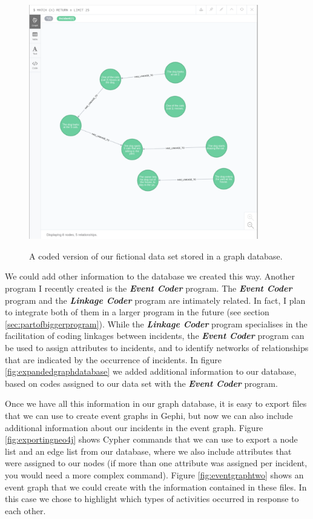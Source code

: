 \documentclass{memoir}
\begin{document}
\begin{figure}[h!]
  \centering
  \caption{A coded version of our fictional data set stored in a graph database.}
  \includegraphics[width=100mm]{Screenshot_17.pdf}
  \label{fig:graphdatabaseexample}
\end{figure}

We could add other information to the database we created this way. Another program I recently created is the \textbf{\emph{Event Coder}} program. The \textbf{\emph{Event Coder}} program and the \textbf{\emph{Linkage Coder}} program are intimately related. In fact, I plan to integrate both of them in a larger program in the future (see section \ref{sec:partofbiggerprogram}). While the \textbf{\emph{Linkage Coder}} program specialises in the facilitation of coding linkages between incidents, the \emph{\textbf{Event Coder}} program can be used to assign attributes to incidents, and to identify networks of relationships that are indicated by the occurrence of incidents. In figure \ref{fig:expandedgraphdatabase} we added additional information to our database, based on codes assigned to our data set with the \textbf{\emph{Event Coder}} program.

Once we have all this information in our graph database, it is easy to export files that we can use to create event graphs in Gephi, but now we can also include additional information about our incidents in the event graph. Figure \ref{fig:exportingneo4j} shows Cypher commands that we can use to export a node list and an edge list from our database, where we also include attributes that were assigned to our nodes (if more than one attribute was assigned per incident, you would need a more complex command). Figure \ref{fig:eventgraphtwo} shows an event graph that we could create with the information contained in these files. In this case we chose to highlight which types of activities occurred in response to each other.
\end{document}
